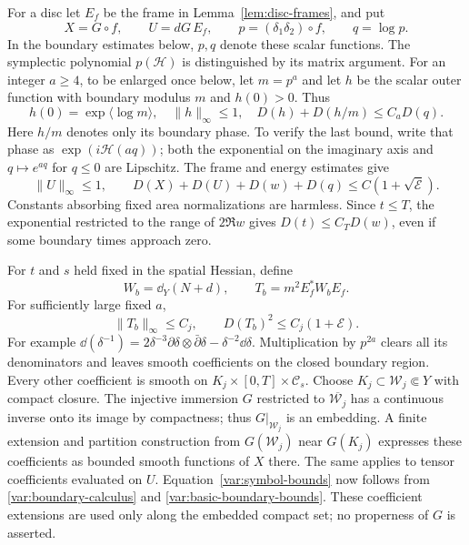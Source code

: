 For a disc let $E_f$ be the frame in Lemma~\ref{lem:disc-frames}, and put
\[
 X=G\circ f,\qquad U=dG\,E_f,\qquad p=(\delta_1\delta_2)\circ f,
 \qquad q=\log p.
\]
In the boundary estimates below, $p,q$ denote these scalar functions.
The symplectic polynomial $p(\mathcal H)$ is distinguished by its matrix
argument.  For an integer
$a\ge4$, to be enlarged once below, let $m=p^a$ and let $h$ be the scalar
outer function with boundary modulus $m$ and $h(0)>0$.  Thus
\begin{equation}
 h(0)=\exp\langle\log m\rangle,
 \quad \|h\|_\infty\le1,
 \quad D(h)+D(h/m)\le C_a D(q).
 \label{var:outer-wall}
\end{equation}
Here $h/m$ denotes only its boundary phase.  To verify the last bound,
write that phase as $\exp(i\mathcal H(aq))$; both the exponential on the
imaginary axis and $q\mapsto e^{aq}$ for $q\le0$ are Lipschitz.
The frame and energy estimates give
\begin{equation}
 \|U\|_\infty\le1,\qquad
 D(X)+D(U)+D(w)+D(q)\le C(1+\sqrt{\mathcal E}).
 \label{var:basic-boundary-bounds}
\end{equation}
Constants absorbing fixed area normalizations are harmless.  Since
$t\le T$, the exponential restricted to the range of $2\Re w$ gives
$D(t)\le C_TD(w)$, even if some boundary times approach zero.

For $t$ and $s$ held fixed in the spatial Hessian, define
\begin{equation}
 W_b=\dd_Y(N+d),\qquad T_b=m^2E_f^*W_bE_f.
 \label{var:boundary-symbol}
\end{equation}
For sufficiently large fixed $a$,
\begin{equation}
 \|T_b\|_\infty\le C_j,
 \qquad D(T_b)^2\le C_j(1+\mathcal E).
 \label{var:symbol-bounds}
\end{equation}
For example
$\dd(\delta^{-1})=2\delta^{-3}\partial\delta\otimes\bar\partial\delta
-\delta^{-2}\dd\delta$.
Multiplication by $p^{2a}$ clears all its denominators and leaves smooth
coefficients on the closed boundary region.  Every other coefficient
is smooth on $K_j\times[0,T]\times\mathcal C_s$.
Choose $K_j\subset\mathcal W_j\Subset Y$ with compact closure.
The injective immersion $G$ restricted to $\overline{\mathcal W_j}$
has a continuous inverse onto its image by compactness; thus
$G|_{\mathcal W_j}$ is an embedding.
A finite extension and partition construction from $G(\mathcal W_j)$
near $G(K_j)$ expresses these coefficients as bounded smooth functions
of $X$ there.
The same applies to tensor coefficients evaluated on $U$.
Equation~\eqref{var:symbol-bounds} now follows from
\eqref{var:boundary-calculus} and \eqref{var:basic-boundary-bounds}.
These coefficient extensions are used only along the embedded compact
set; no properness of $G$ is asserted.

